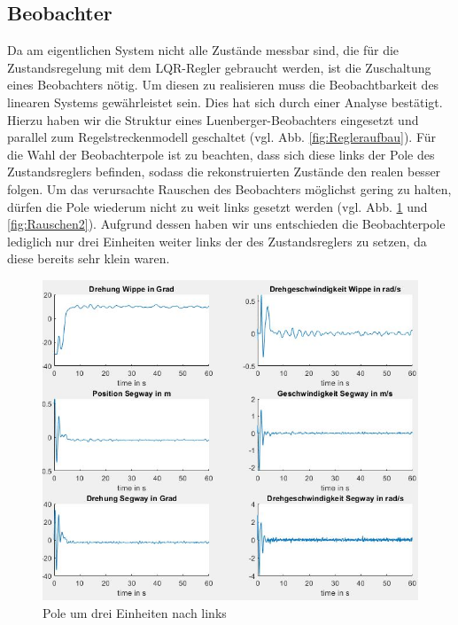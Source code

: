 \documentclass[pdf]{ifacconf}
\begin{document}
	\subsection{Beobachter}
		Da am eigentlichen System nicht alle Zustände messbar sind, die für die Zustandsregelung 			mit dem LQR-Regler gebraucht werden, ist die Zuschaltung eines Beobachters nötig.
	Um diesen zu realisieren muss die Beobachtbarkeit des linearen Systems gewährleistet sein.
	Dies hat sich durch einer Analyse bestätigt.
	Hierzu haben wir die Struktur eines Luenberger-Beobachters eingesetzt und parallel zum            	Regelstreckenmodell geschaltet (vgl. Abb. \ref{fig:Regleraufbau}). Für die Wahl der Beobachterpole ist zu beachten, dass sich diese links der Pole des Zustandsreglers befinden, sodass die rekonstruierten Zustände den realen besser folgen. Um das verursachte Rauschen des Beobachters möglichst gering zu halten, dürfen die Pole wiederum nicht zu weit links gesetzt werden (vgl. Abb. \ref{fig:Rauschen1} und \ref{fig:Rauschen2}). Aufgrund dessen haben wir uns entschieden die Beobachterpole lediglich nur drei Einheiten weiter links der des Zustandsreglers zu setzen, da diese bereits sehr klein waren. 
	
	
	\begin{figure}[H]	
\centerline{\includegraphics[width=\linewidth]{Bilder/Regler1.jpg}}
	\caption{Pole um drei Einheiten nach links}	\label{fig:Rauschen1}
\end{figure}
\end{document}
